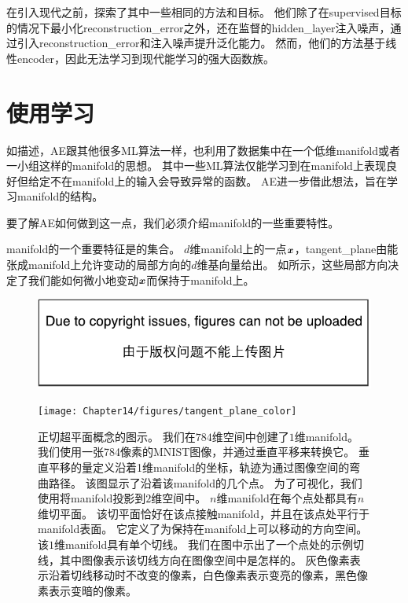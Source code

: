 在引入现代之前，\citet{Inayoshi-and-Kurita-2005}探索了其中一些相同的方法和目标。
他们除了在\gls{supervised}目标的情况下最小化\gls{reconstruction_error}之外，还在监督的\gls{hidden_layer}注入噪声，通过引入\gls{reconstruction_error}和注入噪声提升泛化能力。
然而，他们的方法基于线性\gls{encoder}，因此无法学习到现代能学习的强大函数族。



\section{使用学习}
\label{sec:learning_manifolds_with_autoencoders}

如描述，\gls{AE}跟其他很多\gls{ML}算法一样，也利用了数据集中在一个低维\gls{manifold}或者一小组这样的\gls{manifold}的思想。
其中一些\gls{ML}算法仅能学习到在\gls{manifold}上表现良好但给定不在\gls{manifold}上的输入会导致异常的函数。
\gls{AE}进一步借此想法，旨在学习\gls{manifold}的结构。


要了解\gls{AE}如何做到这一点，我们必须介绍\gls{manifold}的一些重要特性。


\gls{manifold}的一个重要特征是的集合。
$d$维\gls{manifold}上的一点$\boldsymbol{\mathit{x}}$，\gls{tangent_plane}由能张成\gls{manifold}上允许变动的局部方向的$d$维基向量给出。
如所示，这些局部方向决定了我们能如何微小地变动$\boldsymbol{\mathit{x}}$而保持于\gls{manifold}上。

\begin{figure}[!htb]
\ifOpenSource
\centerline{\includegraphics{figure.pdf}}
\else
\centerline{\texttt{[image: Chapter14/figures/tangent\_plane\_color]}}
\fi
\caption{正切超平面概念的图示。
我们在$784$维空间中创建了$1$维\gls{manifold}。
我们使用一张784像素的MNIST图像，并通过垂直平移来转换它。
垂直平移的量定义沿着1维\gls{manifold}的坐标，轨迹为通过图像空间的弯曲路径。
该图显示了沿着该\gls{manifold}的几个点。
为了可视化，我们使用将\gls{manifold}投影到$2$维空间中。
$n$维\gls{manifold}在每个点处都具有$n$维切平面。
该切平面恰好在该点接触\gls{manifold}，并且在该点处平行于\gls{manifold}表面。
它定义了为保持在\gls{manifold}上可以移动的方向空间。
该$1$维\gls{manifold}具有单个切线。
我们在图中示出了一个点处的示例切线，其中图像表示该切线方向在图像空间中是怎样的。
灰色像素表示沿着切线移动时不改变的像素，白色像素表示变亮的像素，黑色像素表示变暗的像素。
}
\label{fig:chap14_tangent_plane_color}
\end{figure}

